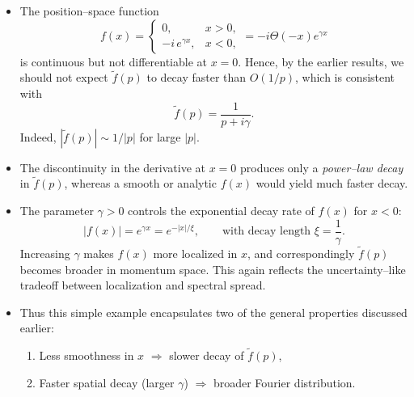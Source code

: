 \documentclass[11pt,a4paper]{article}
\begin{document}
\begin{itemize}
	\item The position--space function
	\[
	f(x) =
	\begin{cases}
		0, & x > 0, \\[4pt]
		-i\,e^{\gamma x}, & x < 0,
	\end{cases} = -i\Theta(-x)e^{\gamma x}
	\]
	is continuous but not differentiable at $x=0$. 
	Hence, by the earlier results, we should not expect $\tilde{f}(p)$ to decay faster than $O(1/p)$, 
	which is consistent with
	\[
	\tilde{f}(p) = \frac{1}{p+i\gamma}.
	\]
	Indeed, $|\tilde{f}(p)| \sim 1/|p|$ for large $|p|$.
	
	\item The discontinuity in the derivative at $x=0$ produces only a \emph{power--law decay} in $\tilde{f}(p)$,
	whereas a smooth or analytic $f(x)$ would yield much faster decay.
	
	\item The parameter $\gamma>0$ controls the exponential decay rate of $f(x)$ for $x<0$:
	\[
	|f(x)| = e^{\gamma x} = e^{-|x|/\xi},
	\qquad \text{with decay length } \xi = \frac{1}{\gamma}.
	\]
	Increasing $\gamma$ makes $f(x)$ more localized in $x$, 
	and correspondingly $\tilde{f}(p)$ becomes broader in momentum space.
	This again reflects the uncertainty--like tradeoff between localization and spectral spread.
	
	\item Thus this simple example encapsulates two of the general properties discussed earlier:
	\begin{enumerate}
		\item Less smoothness in $x$ $\Rightarrow$ slower decay of $\tilde{f}(p)$,
		\item Faster spatial decay (larger $\gamma$) $\Rightarrow$ broader Fourier distribution.
	\end{enumerate}
\end{itemize}
\end{document}
